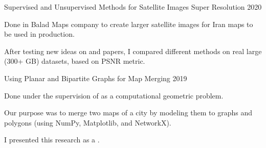 \begin{cvprojects}
  \cvproject
    {Supervised and Unsupervised Methods for Satellite Images Super Resolution} %
    {} %
    {} %
    {2020} %
    {
      \begin{cvitems} %
        \item {Done in Balad Maps company to create larger satellite images for Iran maps to be used in production.}
        \item {After testing new ideas on  and  papers, I compared different methods on real large (300+ GB) datasets, based on PSNR metric.}
      \end{cvitems}
    }

  \cvproject
    {Using Planar and Bipartite Graphs for Map Merging} %
    {} %
    {} %
    {2019} %
    {
      \begin{cvitems} %
        \item {Done under the supervision of  as a computational geometric problem.}
        \item {Our purpose was to merge two maps of a city by modeling them to graphs and polygons (using NumPy, Matplotlib, and NetworkX).}
        \item {I presented this research as a .}
      \end{cvitems}
    }

\end{cvprojects}